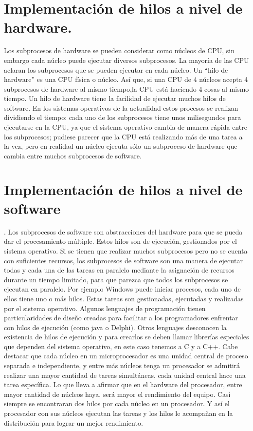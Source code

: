 \documentclass{article}
\begin{document}
\section{Implementación de hilos a nivel de hardware.}
Los subprocesos de hardware se pueden considerar como núcleos de CPU, sin embargo cada núcleo puede ejecutar diversos subprocesos. La mayoría de las CPU aclaran los subprocesos que se pueden ejecutar en cada núcleo. \cite{Tesis}
Un “hilo de hardware” es una CPU física o núcleo. Así que, si una CPU de 4 núcleos acepta 4 subprocesos de hardware al mismo tiempo,la CPU está haciendo 4 cosas al mismo tiempo. Un hilo de hardware tiene la facilidad de ejecutar muchos hilos de software. En los sistemas operativos de la actualidad estos procesos se realizan dividiendo el tiempo: cada uno de los subprocesos tiene unos milisegundos para ejecutarse en la CPU, ya que el sistema operativo cambia de manera rápida entre los subprocesos; pudiese parecer que la CPU está realizando más de una tarea a la vez, pero en realidad un núcleo ejecuta sólo un subproceso de hardware que cambia entre muchos subprocesos de software.

\section{Implementación de hilos a nivel de software}.\cite{Butenhof2008}
Los subprocesos de software son abstracciones del hardware para que se pueda dar el procesamiento múltiple. Estos hilos son de ejecución, gestionados por el sistema operativo. Si se tienen que realizar muchos subprocesos pero no se cuenta con suficientes recursos, los subprocesos de software son una manera de ejecutar todas y cada una de las tareas en paralelo mediante la asignación de recursos durante un tiempo limitado, para que parezca que todos los subprocesos se ejecutan en paralelo. Por ejemplo Windows puede iniciar procesos, cada uno de ellos tiene uno o más hilos. Estas tareas son gestionadas, ejecutadas y realizadas por el sistema operativo.
Algunos lenguajes de programación tienen particularidades de diseño creadas para facilitar a los programadores enfrentar con hilos de ejecución (como java o Delphi). Otros lenguajes desconocen la existencia de hilos de ejecución y para crearlos se deben llamar librerías especiales que dependen del sistema operativo, en este caso tenemos a C y a C++.
Cabe destacar que cada núcleo en un microprocesador es una unidad central de proceso separada e independiente, y entre más núcleos tenga un procesador se admitirá realizar una mayor cantidad de tareas simultáneas, cada unidad central hace una tarea específica. Lo que lleva a afirmar que en el hardware del procesador, entre mayor cantidad de núcleos haya, será mayor el rendimiento del equipo.  Casi siempre se encontraran dos hilos por cada núcleo en un procesador. Y así el procesador con sus núcleos ejecutan las tareas y los hilos le acompañan en la distribución para lograr un mejor rendimiento.
\end{document}
